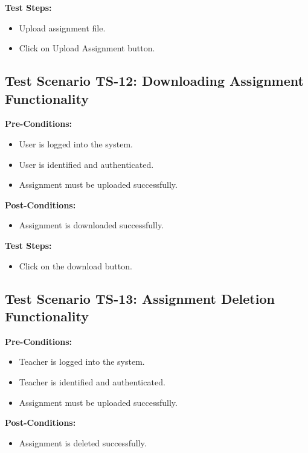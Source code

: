 \textbf{Test Steps:}
\begin{itemize}

\item Upload assignment file.
\item Click on Upload Assignment button.

\end{itemize}


\subsection{Test Scenario TS-12: Downloading Assignment Functionality}
\textbf{Pre-Conditions: }
\begin{itemize}

\item User is logged into the system.
\item User is identified and authenticated.
\item Assignment must be uploaded successfully.

\end{itemize}
\textbf{Post-Conditions: }
\begin{itemize}
\item Assignment is downloaded successfully.
\end{itemize}

\textbf{Test Steps:}
\begin{itemize}

\item Click on the download button.

\end{itemize}

\subsection{Test Scenario TS-13: Assignment Deletion Functionality}
\textbf{Pre-Conditions: }
\begin{itemize}

\item Teacher is logged into the system.
\item Teacher is identified and authenticated.
\item Assignment must be uploaded successfully.

\end{itemize}
\textbf{Post-Conditions: }
\begin{itemize}
\item Assignment is deleted successfully.
\end{itemize}

